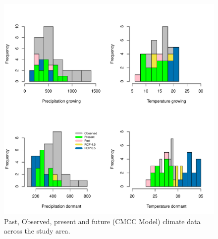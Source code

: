 \documentclass[12pt]{article}\usepackage[]{graphicx}\usepackage[dvipsnames]{xcolor}
\begin{document}
\begin{figure}[H]
		\centering
		\includegraphics[width=0.99\linewidth]{Figures/CMCC.pdf}
		\caption{Past, Observed, present and future (CMCC Model) climate data across the study area.}
		\label{Sup:projectionCMCC}
\end{figure}
\end{document}
